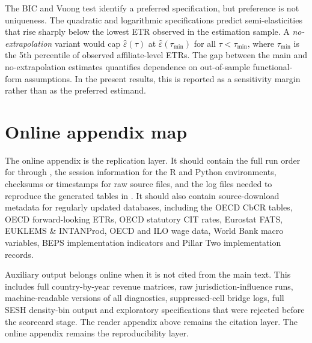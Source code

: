 \documentclass[11pt,a4paper]{article}
\begin{document}
The BIC and Vuong test identify a preferred specification, but preference is not uniqueness. The quadratic and logarithmic specifications predict semi-elasticities that rise sharply below the lowest ETR observed in the estimation sample. A \emph{no-extrapolation} variant would cap $\hat{\varepsilon}(\tau)$ at $\hat{\varepsilon}(\tau_{\min})$ for all $\tau < \tau_{\min}$, where $\tau_{\min}$ is the 5th percentile of observed affiliate-level ETRs. The gap between the main and no-extrapolation estimates quantifies dependence on out-of-sample functional-form assumptions. In the present results, this is reported as a sensitivity margin rather than as the preferred estimand.

\section{Online appendix map}\label{app:online}

The online appendix is the replication layer. It should contain the full run order for  through , the session information for the R and Python environments, checksums or timestamps for raw source files, and the log files needed to reproduce the generated tables in . It should also contain source-download metadata for regularly updated databases, including the OECD CbCR tables, OECD forward-looking ETRs, OECD statutory CIT rates, Eurostat FATS, EUKLEMS \& INTANProd, OECD and ILO wage data, World Bank macro variables, BEPS implementation indicators and Pillar Two implementation records.

Auxiliary output belongs online when it is not cited from the main text. This includes full country-by-year revenue matrices, raw jurisdiction-influence runs, machine-readable versions of all diagnostics, suppressed-cell bridge logs, full SESH density-bin output and exploratory specifications that were rejected before the scorecard stage. The reader appendix above remains the citation layer. The online appendix remains the reproducibility layer.
\end{document}
